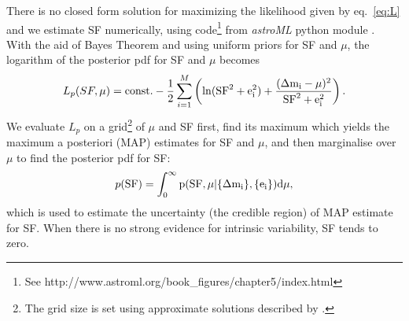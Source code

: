 \documentclass[fleqn,usenatbib]{mnras}
\begin{document}
There is no closed form solution for maximizing the likelihood given by eq.~\ref{eq:L} and
we estimate SF numerically, using code\footnote{See http://www.astroml.org/book\_figures/chapter5/index.html}
from {\it astroML} python module \citep{astroML}. With the aid of Bayes Theorem and using uniform priors
for SF and $\mu$, the logarithm of the posterior pdf for SF and $\mu$ becomes
\begin{equation}
\label{eq:logP}
L_p(SF,\mu) = {\rm const.} - {1\over2} \sum_{i=1}^M \left( \ln(\rm{SF}^2+e_i^2)
               + {  (\Delta m_i-\mu)^2 \over \rm{SF}^2+e_i^2} \right).
\end{equation}
We evaluate $L_{p}$ on a grid\footnote{The grid size is set using approximate solutions described by \cite{ivezic2014}.}
of $\mu$ and SF first, find its maximum which yields the maximum a posteriori (MAP) estimates for SF and $\mu$, 
and then marginalise over $\mu$ to find the posterior pdf for SF: 
\begin{equation}
p(\rm{SF}) = \int_{0}^{\infty} {p(\rm{SF}, \mu |\{\Delta m_{i}\}, \{e_{i}\})} d \mu,
\end{equation}
which is used to estimate the uncertainty (the credible region) of MAP estimate for SF. When there is no strong 
evidence for intrinsic variability, SF tends to zero. 
\end{document}
